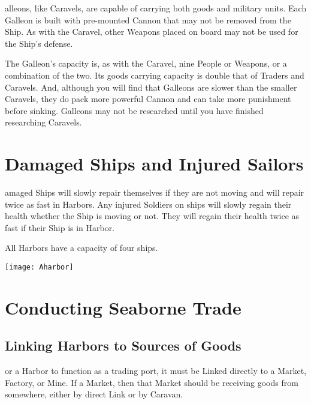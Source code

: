 alleons, like Caravels, are capable of carrying both goods and military units. Each Galleon is built with pre-mounted Cannon that may not be removed from the Ship. As with the Caravel, other Weapons placed on board may not be used for the Ship’s defense.

The Galleon’s capacity is, as with the Caravel, nine People or Weapons, or a combination of the two. Its goods carrying capacity is double that of Traders and Caravels. And, although you will find that Galleons are slower than the smaller Caravels, they do pack more powerful Cannon and can take more punishment before sinking. Galleons may not be researched until you have finished researching Caravels.

\section{\textsf{Damaged Ships and Injured Sailors}}


amaged Ships will slowly repair themselves if they are not moving and will repair twice as fast in Harbors. Any injured Soldiers on ships will slowly regain their health whether the Ship is moving or not. They will regain their health twice as fast if their Ship is in Harbor.

All Harbors have a capacity of four ships.

\begin{center}
    \texttt{[image: Aharbor]} %
\end{center}

\section{\textsf{Conducting Seaborne Trade}}



\subsection{\textsf{Linking Harbors to Sources of Goods}}


or a Harbor to function as a trading port, it must be Linked directly to a Market, Factory, or Mine. If a Market, then that Market should be receiving goods from somewhere, either by direct Link or by Caravan.

